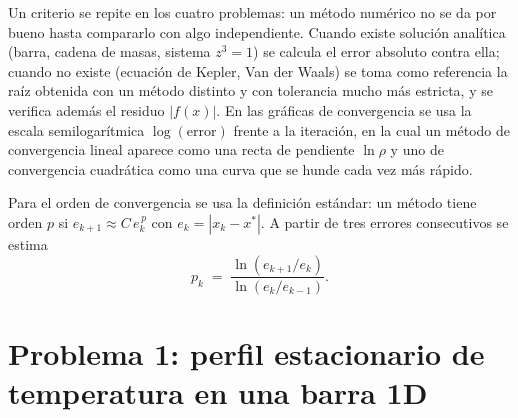 \documentclass[11pt,a4paper]{article}
\begin{document}
Un criterio se repite en los cuatro problemas: un método numérico no se da por bueno hasta compararlo con algo independiente. Cuando existe solución analítica (barra, cadena de masas, sistema $z^3=1$) se calcula el error absoluto contra ella; cuando no existe (ecuación de Kepler, Van der Waals) se toma como referencia la raíz obtenida con un método distinto y con tolerancia mucho más estricta, y se verifica además el residuo $|f(x)|$. En las gráficas de convergencia se usa la escala semilogarítmica $\log(\text{error})$ frente a la iteración, en la cual un método de convergencia lineal aparece como una recta de pendiente $\ln\rho$ y uno de convergencia cuadrática como una curva que se hunde cada vez más rápido.

Para el orden de convergencia se usa la definición estándar: un método tiene orden $p$ si $e_{k+1}\approx C\,e_k^{\,p}$ con $e_k=|x_k-x^*|$. A partir de tres errores consecutivos se estima
\begin{equation}
p_k \;=\; \frac{\ln(e_{k+1}/e_k)}{\ln(e_k/e_{k-1})}. \label{eq:orden}
\end{equation}

\section{Problema 1: perfil estacionario de temperatura en una barra 1D}
\end{document}
